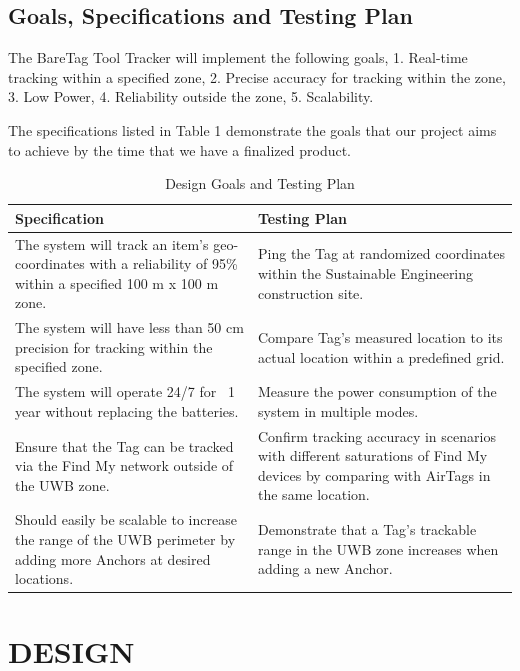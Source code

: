 \documentclass[conference]{IEEEtran}
\begin{document}
\subsection{Goals, Specifications and Testing Plan}

The BareTag Tool Tracker will implement the following goals, 1. Real-time 
tracking within a specified zone, 2. Precise accuracy for tracking within 
the zone, 3. Low Power,  4. Reliability outside the zone, 5. Scalability.

The specifications listed in Table 1 demonstrate the goals that our project 
aims to achieve by the time that we have a finalized product.
\begin{center}
\begin{table}
\caption{Design Goals and Testing Plan}
\begin{tabular}{|p{4cm}|p{4cm}|}
    \hline
    \textbf{Specification}  & \textbf{Testing Plan}\\
    \hline
    The system will track an item’s geo-coordinates with a reliability of 
    95\% within a specified 100 m x 100 m zone. 
    &
    Ping the Tag at randomized coordinates within the Sustainable 
    Engineering construction site.\\
    \hline
    The system will have less than 50 cm precision for tracking within 
    the specified zone.
    &
    Compare Tag’s measured location to its actual location 
    within a predefined grid.\\
    \hline
    The system will operate 24/7 for ~1 year without 
    replacing the batteries.
    &
    Measure the power consumption of the system in multiple modes.\\
    \hline
    Ensure that the Tag can be tracked via the Find My network outside 
    of the UWB zone.
    &
    Confirm tracking accuracy in scenarios with different saturations 
    of Find My devices by comparing with AirTags in the same location.\\
    \hline
    Should easily be scalable to increase the range of the UWB perimeter 
    by adding more Anchors at desired locations.
    &
    Demonstrate that a Tag’s trackable range in the UWB zone increases 
    when adding a new Anchor.\\
    \hline
\end{tabular}
\end{table}
\end{center}


\section{DESIGN}
\end{document}
